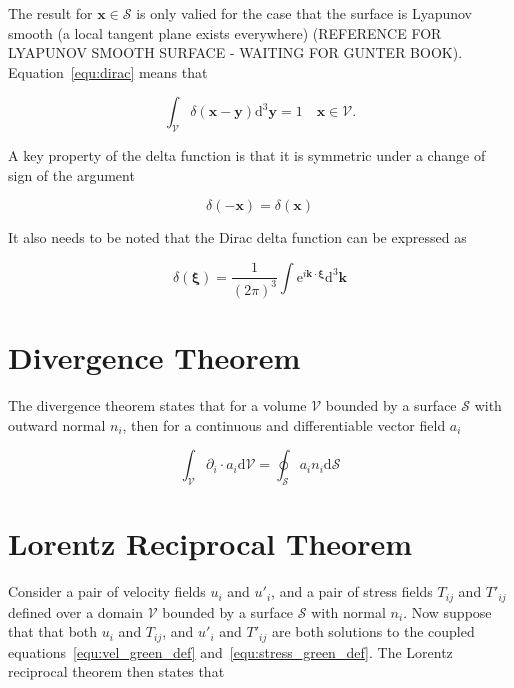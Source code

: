 \documentclass[12pt]{article}
\begin{document}
The result for $\boldsymbol{x} \in \mathcal{S}$ is only valied for the case that the surface is Lyapunov smooth (a local tangent plane exists everywhere) (REFERENCE FOR LYAPUNOV SMOOTH SURFACE - WAITING FOR GUNTER BOOK). Equation~\ref{equ:dirac} means that

\begin{equation}
\label{equ:delta_int}
\int_{\mathcal{V}} \delta(\boldsymbol{x} - \boldsymbol{y}) \mathrm{d}^{3} \boldsymbol{y} = 1 \quad \boldsymbol{x} \in \mathcal{V}.
\end{equation}

A key property of the delta function is that it is symmetric under a change of sign of the argument

\begin{equation}
\label{equ:delta_sym}
\delta(-\boldsymbol{x}) = \delta(\boldsymbol{x})
\end{equation}

It also needs to be noted that the Dirac delta function can be expressed as \citep{Riley06}

\begin{equation}
\label{equ:delta_int_def}
\delta (\boldsymbol{\xi}) = \frac{1}{(2 \pi)^{3}} \int \mathrm{e}^{i \boldsymbol{k} \cdot \boldsymbol{\xi}} \mathrm{d}^{3} \boldsymbol{k}
\end{equation}


\section{Divergence Theorem}
\label{app:div_theory}

The divergence theorem states that for a volume $\mathcal{V}$ bounded by a surface $\mathcal{S}$ with outward normal $n_{i}$, then for a continuous and differentiable vector field $a_{i}$ \cite{Riley06}

\begin{equation}
\label{equ:div_theory}
\int_{\mathcal{V}} \partial_{i} \cdot a_{i} \mathrm{d} \mathcal{V} = \oint_{\mathcal{S}} a_{i} n_{i} \mathrm{d} \mathcal{S}
\end{equation}

\section{Lorentz Reciprocal Theorem}
\label{app:Lorentz}

Consider a pair of velocity fields $u_{i}$ and $u'_{i}$, and a pair of stress fields $T_{ij}$ and $T'_{ij}$ defined over a domain $\mathcal{V}$ bounded by a surface $\mathcal{S}$ with normal $n_{i}$. Now suppose that that both $u_{i}$ and $T_{ij}$, and $u'_{i}$ and $T'_{ij}$ are both solutions to the coupled equations~\ref{equ:vel_green_def} and~\ref{equ:stress_green_def}. The Lorentz reciprocal theorem then states that \citep{Kim05}
\end{document}
